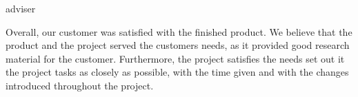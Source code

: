 adviser\documentclass[../document]{subfiles}
\begin{document}
Overall, our customer was satisfied with the finished product. We believe that the product and the project served the customers needs, as it provided good research material for the customer. Furthermore, the project satisfies the needs set out it the project tasks as closely as possible, with the time given and with the changes introduced throughout the project.
\end{document}
